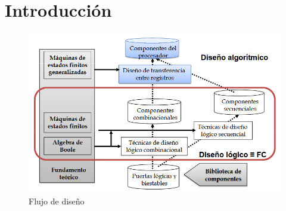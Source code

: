 \section{Introducción}
\begin{figure}[H]
	\centering
	\includegraphics[width=\textwidth]{images/Tema_4/Flujo_Diseno.PNG}
	\caption{Flujo de diseño}
\end{figure}
